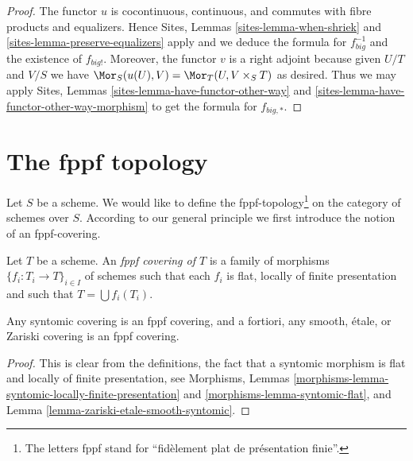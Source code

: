 \begin{proof}
The functor $u$ is cocontinuous, continuous, and commutes with fibre products
and equalizers. Hence
Sites, Lemmas \ref{sites-lemma-when-shriek} and
\ref{sites-lemma-preserve-equalizers}
apply and we deduce the formula
for $f_{big}^{-1}$ and the existence of $f_{big!}$. Moreover,
the functor $v$ is a right adjoint because given $U/T$ and $V/S$
we have $\Mor_S(u(U), V) = \Mor_T(U, V \times_S T)$
as desired. Thus we may apply
Sites, Lemmas \ref{sites-lemma-have-functor-other-way} and
\ref{sites-lemma-have-functor-other-way-morphism} to get the
formula for $f_{big, *}$.
\end{proof}













\section{The fppf topology}
\label{section-fppf}

\noindent
Let $S$ be a scheme. We would like to define the fppf-topology\footnote{
The letters fppf stand for ``fid\`element plat de pr\'esentation finie''.} on
the category of schemes over $S$. According to our general principle
we first introduce the notion of an fppf-covering.

\begin{definition}
\label{definition-fppf-covering}
Let $T$ be a scheme. An {\it fppf covering of $T$} is a family
of morphisms $\{f_i : T_i \to T\}_{i \in I}$ of schemes
such that each $f_i$ is flat, locally of finite presentation and such
that $T = \bigcup f_i(T_i)$.
\end{definition}

\begin{lemma}
\label{lemma-zariski-etale-smooth-syntomic-fppf}
Any syntomic covering is an fppf covering, and a fortiori,
any smooth, \'etale, or Zariski covering is an fppf covering.
\end{lemma}

\begin{proof}
This is clear from the definitions, the fact that a syntomic morphism
is flat and locally of finite presentation, see
Morphisms, Lemmas
\ref{morphisms-lemma-syntomic-locally-finite-presentation} and
\ref{morphisms-lemma-syntomic-flat},
and
Lemma \ref{lemma-zariski-etale-smooth-syntomic}.
\end{proof}

